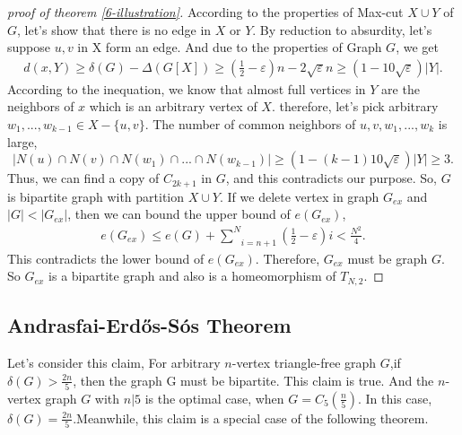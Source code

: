 \documentclass{article}
\theoremstyle{definition}
\def\Erdos{Erd\H{o}s}
\renewcommand{\epsilon}{\varepsilon}
\begin{document}
\begin{proof}[proof of theorem \ref{6-illustration}]
According to the properties of Max-cut $X \cup Y$ of $G$, let's show that there is no edge in $X$ or $Y$. By reduction to absurdity, let's suppose $u,v$ in X form an edge. And due to the properties of Graph $G$, we get
\begin{align*}
d(x,Y) \ge \delta(G)-\Delta(G[X]) \ge (\frac{1}{2}-\epsilon)n-2\sqrt{\epsilon}n \ge (1-10\sqrt{\epsilon})|Y|.
\end{align*}
According to the inequation, we know that almost full vertices in $Y$ are the neighbors of $x$ which is an arbitrary vertex of $X$. therefore, let's pick arbitrary $w_1,...,w_{k-1} \in X-\{u,v\}$. The number of common neighbors of $u,v,w_1,...,w_k$ is large,
$$|N(u) \cap N(v) \cap N(w_1) \cap...\cap N(w_{k-1})| \ge (1-(k-1)10\sqrt{\epsilon})|Y| \ge 3.$$
Thus, we can find a copy of $C_{2k+1}$ in $G$, and this contradicts our purpose. So, $G$ is bipartite graph with partition $X \cup Y$. If we delete vertex in graph $G_{ex}$ and $|G| < |G_{ex}|$, then we can bound the upper bound of $e(G_{ex})$,
\begin{align*}
e(G_{ex}) \le e(G) + \underset{i=n+1}{\overset{N}{\sum}}(\frac{1}{2}-\epsilon)i< \frac{N^2}{4}.
\end{align*}
This contradicts the lower bound of $e(G_{ex})$. Therefore, $G_{ex}$ must be graph $G$. So $G_{ex}$ is a bipartite graph and also is a homeomorphism of $T_{N,2}$.
\end{proof}

\subsection{Andrasfai-\Erdos{}-S\'os Theorem}
Let's consider this claim, For arbitrary $n$-vertex triangle-free graph $G$,if $\delta(G) > \frac{2n}{5}$, then the graph G must be bipartite. This claim is true. And the $n$-vertex graph $G$ with $n|5$ is the optimal case, when $G = C_5(\frac{n}{5})$. In this case, $\delta(G)=\frac{2n}{5}. $Meanwhile, this claim is a special case of the following theorem.
\end{document}
